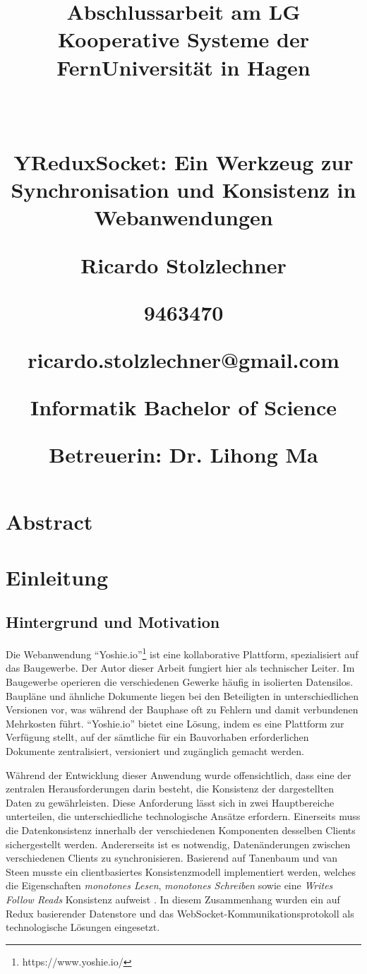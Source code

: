 \documentclass[12pt]{book}          %
\title{
\begin{center}
   \parskip1\baselineskip

   \large
   Abschlussarbeit am LG Kooperative Systeme der FernUniversität in Hagen
   
   ~
   
   \LARGE\bfseries 
    YReduxSocket: Ein Werkzeug zur Synchronisation und Konsistenz in Webanwendungen

   \large
   Ricardo Stolzlechner
   
   9463470
   
   ricardo.stolzlechner@gmail.com
   
   Informatik Bachelor of Science
   
   Betreuerin: Dr. Lihong Ma
\end{center}
}
\author{}
\begin{document}
\maketitle

\chapter*{Abstract}

\newpage

\tableofcontents
\listoffigures
\listofalgorithms

\newpage

\chapter{Einleitung}
\label{chap-einleitung}

\section{Hintergrund und Motivation}
\label{sec-hintergrund-und-motivation}

Die Webanwendung "`Yoshie.io"'\footnote{https://www.yoshie.io/} ist eine kollaborative Plattform, spezialisiert auf das Baugewerbe. Der Autor dieser Arbeit fungiert hier als technischer Leiter. Im Baugewerbe operieren die verschiedenen Gewerke häufig in isolierten Datensilos. Baupläne und ähnliche Dokumente liegen bei den Beteiligten in unterschiedlichen Versionen vor, was während der Bauphase oft zu Fehlern und damit verbundenen Mehrkosten führt. "`Yoshie.io"' bietet eine Lösung, indem es eine Plattform zur Verfügung stellt, auf der sämtliche für ein Bauvorhaben erforderlichen Dokumente zentralisiert, versioniert und zugänglich gemacht werden. 

Während der Entwicklung dieser Anwendung wurde offensichtlich, dass eine der zentralen Herausforderungen darin besteht, die Konsistenz der dargestellten Daten zu gewährleisten. Diese Anforderung lässt sich in zwei Hauptbereiche unterteilen, die unterschiedliche technologische Ansätze erfordern. Einerseits muss die Datenkonsistenz innerhalb der verschiedenen Komponenten desselben Clients sichergestellt werden. Andererseits ist es notwendig, Datenänderungen zwischen verschiedenen Clients zu synchronisieren. Basierend auf Tanenbaum und van Steen musste ein clientbasiertes Konsistenzmodell implementiert werden, welches die Eigenschaften \textit{monotones Lesen}, \textit{monotones Schreiben} sowie eine \textit{Writes Follow Reads} Konsistenz aufweist \cite[322-325]{tanenbaum_verteilte_2008}. In diesem Zusammenhang wurden ein auf Redux basierender Datenstore und das WebSocket-Kommunikationsprotokoll als technologische Lösungen eingesetzt.
\end{document}
